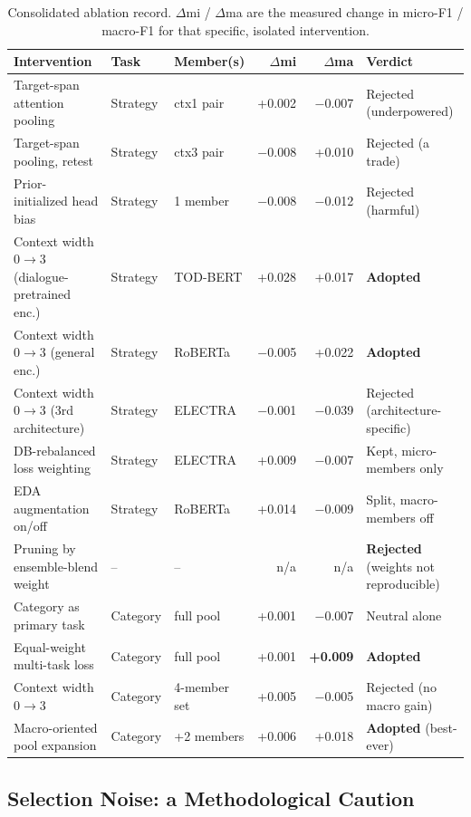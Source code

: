 \begin{table}[H]
\centering
\footnotesize
\caption{Consolidated ablation record. $\Delta$mi / $\Delta$ma are the measured change in
micro-F1 / macro-F1 for that specific, isolated intervention.}
\label{tab:ablation-summary}
\begin{tabular}{@{}p{3.7cm}p{1.3cm}p{3.3cm}rrp{2.2cm}@{}}
\toprule
\textbf{Intervention} & \textbf{Task} & \textbf{Member(s)} & \textbf{$\Delta$mi} & \textbf{$\Delta$ma} & \textbf{Verdict} \\
\midrule
Target-span attention pooling & Strategy & ctx1 pair & +0.002 & $-$0.007 & Rejected (underpowered) \\
Target-span pooling, retest & Strategy & ctx3 pair & $-$0.008 & +0.010 & Rejected (a trade) \\
Prior-initialized head bias & Strategy & 1 member & $-$0.008 & $-$0.012 & Rejected (harmful) \\
Context width 0$\to$3 (dialogue-pretrained enc.) & Strategy & TOD-BERT & +0.028 & +0.017 & \textbf{Adopted} \\
Context width 0$\to$3 (general enc.) & Strategy & RoBERTa & $-$0.005 & +0.022 & \textbf{Adopted} \\
Context width 0$\to$3 (3rd architecture) & Strategy & ELECTRA & $-$0.001 & $-$0.039 & Rejected (architecture-specific) \\
DB-rebalanced loss weighting & Strategy & ELECTRA & +0.009 & $-$0.007 & Kept, micro-members only \\
EDA augmentation on/off & Strategy & RoBERTa & +0.014 & $-$0.009 & Split, macro-members off \\
Pruning by ensemble-blend weight & -- & -- & n/a & n/a & \textbf{Rejected} (weights not reproducible) \\
Category as primary task & Category & full pool & +0.001 & $-$0.007 & Neutral alone \\
Equal-weight multi-task loss & Category & full pool & +0.001 & \textbf{+0.009} & \textbf{Adopted} \\
Context width 0$\to$3 & Category & 4-member set & +0.005 & $-$0.005 & Rejected (no macro gain) \\
Macro-oriented pool expansion & Category & +2 members & +0.006 & +0.018 & \textbf{Adopted} (best-ever) \\
\bottomrule
\end{tabular}
\end{table}

\subsection{Selection Noise: a Methodological Caution}
\label{sec:ablation-selection-noise}

